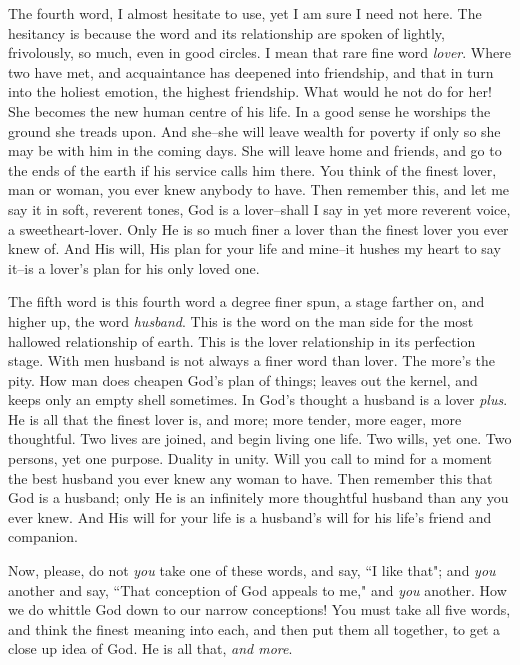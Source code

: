 The fourth word, I almost hesitate to use, yet I am sure I need not here.
The hesitancy is because the word and its relationship are spoken of
lightly, frivolously, so much, even in good circles. I mean that rare fine
word \textit{lover}. Where two have met, and acquaintance has deepened into
friendship, and that in turn into the holiest emotion, the highest
friendship. What would he not do for her! She becomes the new human centre
of his life. In a good sense he worships the ground she treads upon. And
she--she will leave wealth for poverty if only so she may be with him in
the coming days. She will leave home and friends, and go to the ends of
the earth if his service calls him there. You think of the finest lover,
man or woman, you ever knew anybody to have. Then remember this, and let
me say it in soft, reverent tones, God is a lover--shall I say in yet more
reverent voice, a sweetheart-lover. Only He is so much finer a lover than
the finest lover you ever knew of. And His will, His plan for your life
and mine--it hushes my heart to say it--is a lover's plan for his only
loved one.

The fifth word is this fourth word a degree finer spun, a stage farther
on, and higher up, the word \textit{husband}. This is the word on the man side
for the most hallowed relationship of earth. This is the lover
relationship in its perfection stage. With men husband is not always a
finer word than lover. The more's the pity. How man does cheapen God's
plan of things; leaves out the kernel, and keeps only an empty shell
sometimes. In God's thought a husband is a lover \textit{plus}. He is all that
the finest lover is, and more; more tender, more eager, more thoughtful.
Two lives are joined, and begin living one life. Two wills, yet one. Two
persons, yet one purpose. Duality in unity. Will you call to mind for a
moment the best husband you ever knew any woman to have. Then remember
this that God is a husband; only He is an infinitely more thoughtful
husband than any you ever knew. And His will for your life is a husband's
will for his life's friend and companion.

Now, please, do not \textit{you} take one of these words, and say, ``I like that";
and \textit{you} another and say, ``That conception of God appeals to me," and
\textit{you} another. How we do whittle God down to our narrow conceptions! You
must take all five words, and think the finest meaning into each, and then
put them all together, to get a close up idea of God. He is all that, \textit{and
more}.

